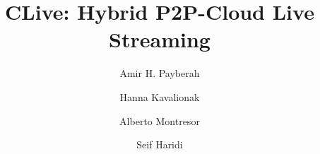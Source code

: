 \newcommand{\BlockDuration}{\delta_c}
\newcommand{\BlockSize}{s_c}
\newcommand{\UpSlots}[1]{\mathit{Up}(#1)}
\newcommand{\DownSlots}[1]{\mathit{Down}(#1)}
\newcommand{\MaxMissing}{P_{\mathit{loss}}}
\newcommand{\tdelay}{T_{\mathit{delay}}}
\newcommand{\tlife}{T_{\mathit{life}}}
\newcommand{\tlcw}{T_{\mathit{lcw}}}
\newcommand{\rtt}{T_{\mathit{rtt}}}
\newcommand{\tround}{T_{\mathit{round}}}
\newcommand{\tlatency}{T_{\mathit{latency}}}
\newcommand{\Cah}{C_{\mathit{ah}}}
\newcommand{\Cvm}{C_{\mathit{vm}}}
\newcommand{\Cph}{C_{\mathit{ph}}}
\newcommand{\Cstorage}{C_{\mathit{storage}}}
\newcommand{\Creq}{C_{\mathit{req}}}
\newcommand{\Ctransfer}{C_{\mathit{chunk}}}
\newcommand{\Root}{{\mathit{root}}}
\newcommand{\DT}{{\mathit{DT}}}
\newcommand{\Depth}{{\mathit{depth}}}
\newcommand{\AH}{{\mathcal{AH}}}
\newcommand{\Nexp}{N_{\mathit{exp}}}
\newcommand{\Ntree}{N_{\mathit{tree}}}
\newcommand{\Nswarm}{N_{\mathit{swarm}}}

\newcommand{\Min}{\fontvar{min}}
\newcommand{\Slots}{\fontvar{slots}}

\newcommand{\fontproc}[1]{\texttt{\small #1}}
\newcommand{\fontvar}[1]{\mathit{#1}}
\newcommand{\Density}{\textsc{Density}\xspace}
\newcommand{\treesize}{\fontproc{size}}
\newcommand{\treesizerec}{\fontproc{recSize}}
\newcommand{\MIN}{\fontproc{min}}
\newcommand{\Random}{\fontproc{random}}
\newcommand{\round}{\fontproc{round}}
\newcommand{\init}{\fontproc{init}}
\newcommand{\poll}{\fontproc{poll}}
\newcommand{\MergeView}{\fontproc{mergeView}}
\newcommand{\updateage}{\fontproc{updateAge}}
\newcommand{\selectoldest}{\fontproc{selectOldest}}
\newcommand{\remove}{\fontproc{remove}}
\newcommand{\add}{\fontproc{add}}
\newcommand{\randomsubset}{\fontproc{randomSubset}}
\newcommand{\request}{\fontproc{REQ}}
\newcommand{\reply}{\fontproc{RES}}
\newcommand{\maxslot}{\fontproc{maxSlot}}
\newcommand{\slot}{\fontproc{slot}}
\newcommand{\sv}{\fontproc{SV}}
\newcommand{\subview}{\fontproc{subview}}

\newcommand{\fakeparagraph}[1]{\vspace{8pt}\noindent\textbf{#1}}

%


\title{CLive: Hybrid P2P-Cloud Live Streaming}

\author{Amir H. Payberah \and Hanna Kavalionak \and Alberto Montresor \and Seif Haridi}


